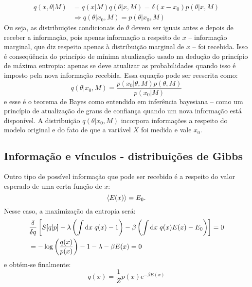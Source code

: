 \begin{align*}
 q(x,\theta|M) &= q(x|M)q(\theta|x, M) =  \delta(x-x_0) p(\theta|x, M) \\ &\Rightarrow q(\theta|x_0, M) = p(\theta|x_0, M)
\end{align*}
Ou seja, as distribuições condicionais de $\theta$ devem ser iguais antes e depois de receber a informação, pois apenas informação a respeito de $x$ -- informação marginal, que diz respeito apenas à distribuição marginal de $x$ -- foi recebida. Isso é conseqüência do princípio de mínima atualização usado na dedução do princípio de máxima entropia: apenas se deve atualizar as probabilidades quando isso é imposto pela nova informação recebida. Essa equação pode ser reescrita como:
\begin{equation}
 q(\theta | x_0, M) = \dfrac{p(x_0 | \theta, M)p(\theta, M)}{p(x_0 |M)}
\end{equation}
e esse é o teorema de Bayes como entendido em inferência bayesiana -- como um princípio de atualização de graus de confiança quando um nova informação está disponível. A distribuição $q(\theta | x_0, M)$ incorpora informações a respeito do modelo original e do fato de que a variável $X$ foi medida e vale $x_0$. 

\subsection{Informação e vínculos - distribuições de Gibbs}
Outro tipo de possível informação que pode ser recebido é a respeito do valor esperado de uma certa função de $x$:
\[
 \left\langle E(x) \right\rangle = E_0.
\]
Nesse caso, a maximização da entropia será:
\begin{align*}
  &\frac{\delta}{\delta q} \left[S[q | p] - \lambda \left(\int \mathrm{d} x\; q(x) -1 \right) - \beta\left(\int\mathrm{d} x\; q(x) E(x) - E_0\right)\right] =0\\
  &= - \log\left(\frac{q(x)}{p(x)}\right) - 1 - \lambda -\beta E(x) = 0
\end{align*}
e obtém-se finalmente:
\begin{equation}
\label{eq:gibbs}
 q(x) = \dfrac{1}{Z}p(x) e^{-\beta E(x)}
\end{equation}

